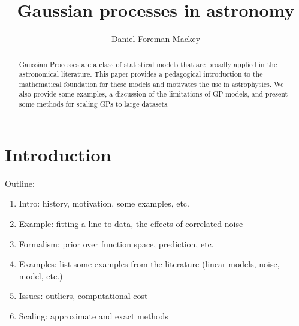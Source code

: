 \documentclass[modern, letterpaper]{aastex61}
\begin{document}
\sloppy\sloppypar\raggedbottom\frenchspacing

\title{Gaussian processes in astronomy}


\author[0000-0002-9328-5652]{Daniel Foreman-Mackey}

\begin{abstract}\noindent

Gaussian Processes are a class of statistical models that are broadly applied
in the astronomical literature.
This paper provides a pedagogical introduction to the mathematical foundation
for these models and motivates the use in astrophysics.
We also provide some examples, a discussion of the limitations of GP models,
and present some methods for scaling GPs to large datasets.

\end{abstract}

\keywords{%
}

\section{Introduction}

Outline:

\begin{enumerate}

\item Intro: history, motivation, some examples, etc.

\item Example: fitting a line to data, the effects of correlated noise

\item Formalism: prior over function space, prediction, etc.

\item Examples: list some examples from the literature (linear models, noise,
    model, etc.)

\item Issues: outliers, computational cost

\item Scaling: approximate and exact methods

\end{enumerate}
\end{document}
